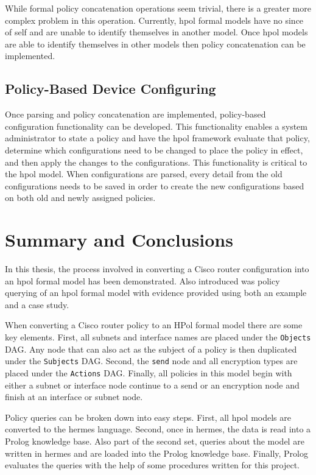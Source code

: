 \documentclass[12pt,letterpaper]{report}
\newcommand{\node}[1]{\texttt{#1}}
\begin{document}
While formal policy concatenation operations seem trivial, there is a greater more complex problem in this operation. Currently, \ac{hpol} formal models have no since of self and are unable to identify themselves in another model. Once \ac{hpol} models are able to identify themselves in other models then policy concatenation can be implemented. 

\section{Policy-Based Device Configuring}
Once parsing and policy concatenation are implemented, policy-based configuration functionality can be developed. This functionality enables a system administrator to state a policy and have the \ac{hpol} framework evaluate that policy, determine which configurations need to be changed to place the policy in effect, and then apply the changes to the configurations. This functionality is critical to the \ac{hpol} model. When configurations are parsed, every detail from the old configurations needs to be saved in order to create the new configurations based on both old and newly assigned policies.

\chapter{Summary and Conclusions}
\label{Chapter:SummaryAndConclustions}

In this thesis, the process involved in converting a Cisco router configuration into an \ac{hpol} formal model has been demonstrated. Also introduced was policy querying of an \ac{hpol} formal model with evidence provided using both an example and a case study.

When converting a Cisco router policy to an HPol formal model there are some key elements. First, all subnets and interface names are placed under the \node{Objects} DAG. Any node that can also act as the subject of a policy is then duplicated under the \texttt{Subjects} DAG. Second, the \node{send} node and all encryption types are placed under the \node{Actions} DAG. Finally, all policies in this model begin with either a subnet or interface node continue to a send or an encryption node and finish at an interface or subnet node. 

Policy queries can be broken down into easy steps. First, all \ac{hpol} models are converted to the \ac{hermes} language. Second, once in \ac{hermes}, the data is read into a Prolog knowledge base. Also part of the second set, queries about the model are written in \ac{hermes} and are loaded into the Prolog knowledge base. Finally, Prolog evaluates the queries with the help of some procedures written for this project.
\end{document}
